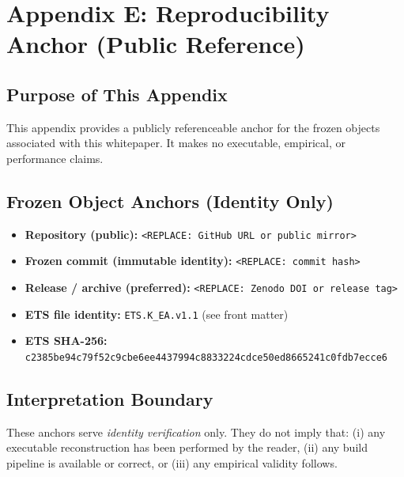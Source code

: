 
\section*{Appendix E: Reproducibility Anchor (Public Reference)}

\subsection*{Purpose of This Appendix}

This appendix provides a publicly referenceable anchor for the frozen
objects associated with this whitepaper.
It makes no executable, empirical, or performance claims.

\subsection*{Frozen Object Anchors (Identity Only)}

\begin{itemize}
  \item \textbf{Repository (public):} \texttt{<REPLACE: GitHub URL or public mirror>}
  \item \textbf{Frozen commit (immutable identity):} \texttt{<REPLACE: commit hash>}
  \item \textbf{Release / archive (preferred):} \texttt{<REPLACE: Zenodo DOI or release tag>}
  \item \textbf{ETS file identity:} \texttt{ETS.K\_EA.v1.1} (see front matter)
  \item \textbf{ETS SHA-256:} \texttt{c2385be94c79f52c9cbe6ee4437994c8833224cdce50ed8665241c0fdb7ecce6}
\end{itemize}

\subsection*{Interpretation Boundary}

These anchors serve \emph{identity verification} only.
They do not imply that:
(i) any executable reconstruction has been performed by the reader,
(ii) any build pipeline is available or correct, or
(iii) any empirical validity follows.

